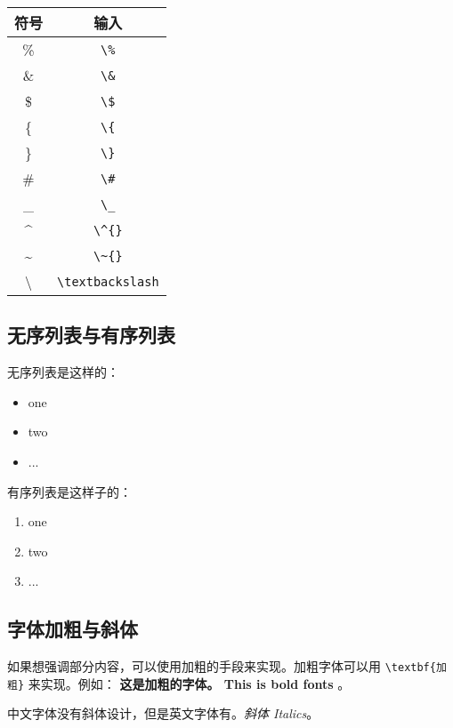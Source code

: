 \documentclass[withoutpreface,bwprint]{cumcmthesis} %
\numberwithin{equation}{subsection}
\begin{document}
\begin{table}[!ht]
	\centering
	\begin{tabular}{cc}
		\toprule
		符号            &  输入                   \\
		\midrule
		\%              &  \verb|\%|             \\
		\&              &  \verb|\&|             \\
		\$              &  \verb|\$|             \\
		\{              &  \verb|\{|             \\
		\}              &  \verb|\}|             \\
		\#              &  \verb|\#|             \\
		\_              &  \verb|\_|             \\
		\^{}            &  \verb|\^{}|           \\
		\~{}            &  \verb|\~{}|           \\
		\textbackslash  &  \verb|\textbackslash| \\
		\bottomrule
	\end{tabular}
\end{table}

\subsection{无序列表与有序列表}

无序列表是这样的：
\begin{itemize}
    \item one
    \item two
    \item ...
\end{itemize}

有序列表是这样子的：
\begin{enumerate}
    \item one
    \item two
    \item ...
\end{enumerate}

\subsection{字体加粗与斜体}

如果想强调部分内容，可以使用加粗的手段来实现。加粗字体可以用 \verb|\textbf{加粗}| 来实现。例如： \textbf{这是加粗的字体。 This is bold fonts} 。

中文字体没有斜体设计，但是英文字体有。\textit{斜体 Italics}。
\end{document}
